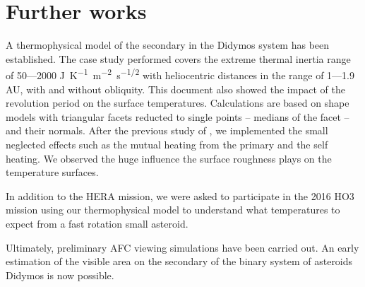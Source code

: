 \section{Further works}
\label{furtherworks}

A thermophysical model of the secondary in the Didymos system has been established. The case study performed covers the extreme thermal inertia range of 50---2000 \si{J.K^{-1}.m^{-2}.s^{-1/2}} with heliocentric distances in the range of 1---1.9 \si{AU}, with and without obliquity. This document also showed the impact of the revolution period on the surface temperatures. Calculations are based on shape models with triangular facets reducted to single points -- medians of the facet -- and their normals. After the previous study of \cite{pelivan}, we implemented the small neglected effects such as the mutual heating from the primary and the self heating. We observed the huge influence the surface roughness plays on the temperature surfaces.

In addition to the HERA mission, we were asked to participate in the 2016 HO3 mission using our thermophysical model to understand what temperatures to expect from a fast rotation small asteroid.

Ultimately, preliminary AFC viewing simulations have been carried out. An early estimation of the visible area on the secondary of the binary system of asteroids Didymos is now possible.
